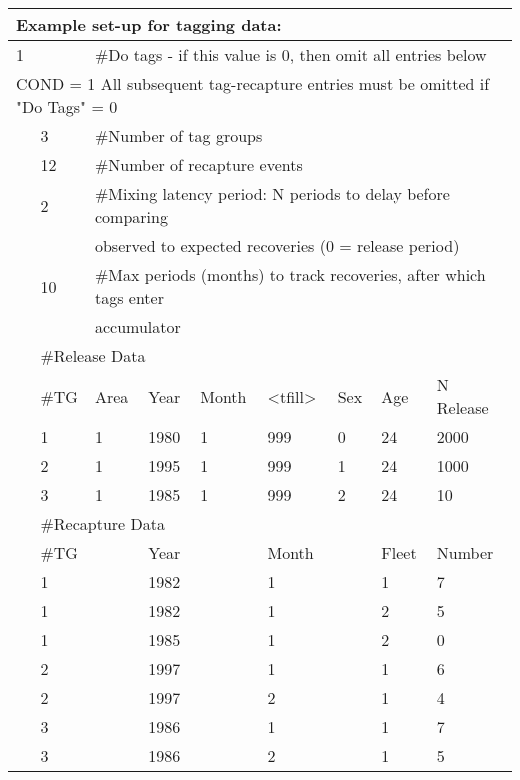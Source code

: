 \begin{center}
	\begin{tabular}{p{1.1cm} p{1.1cm} p{1.1cm} p{1.1cm} p{1.1cm} p{1.1cm} p{1.1cm} p{1.1cm} p{3cm}}
		\multicolumn{9}{l}{Example set-up for tagging data:}\\
		\hline
		1 & & \multicolumn{7}{l}{\#Do tags - if this value is 0, then omit all entries below}\\
		\hline
		\multicolumn{9}{l}{COND = 1 All subsequent tag-recapture entries must be omitted if "Do Tags" = 0}\\
		 & 3 & \multicolumn{7}{l}{\#Number of tag groups}\\
		 \hline
		 & 12 & \multicolumn{7}{l}{\#Number of recapture events}\\
		 \hline
		 & 2 & \multicolumn{7}{l}{\#Mixing latency period: N periods to delay before comparing }\\
		 &   &  \multicolumn{7}{l}{observed to expected recoveries (0 = release period)}\\
		 \hline
		 & 10 & \multicolumn{7}{l}{\#Max periods (months) to track recoveries, after which tags enter}\\
		 &    & \multicolumn{7}{l}{ accumulator}\\
		 \hline
		 & \multicolumn{8}{l}{\#Release Data} \\
		 & \#TG & Area & Year & Month & <tfill> & Sex & Age & N Release\\ 
		 \hline
		 & 1 & 1 & 1980 & 1 & 999 & 0 & 24 & 2000 \\
		 & 2 & 1 & 1995 & 1 & 999 & 1 & 24 & 1000 \\
		 & 3 & 1 & 1985 & 1 & 999 & 2 & 24 & 10 \\
		 \hline
		 & \multicolumn{8}{l}{\#Recapture Data}\\
		 & \#TG &  & Year&  & Month &  & Fleet  & Number\\ 
		 \hline
		 & 1 & & 1982 & & 1 & & 1 & 7 \\
		 & 1 & & 1982 & & 1 & & 2 & 5 \\
		 & 1 & & 1985 & & 1 & & 2 & 0 \\
		 & 2 & & 1997 & & 1 & & 1 & 6 \\
		 & 2 & & 1997 & & 2 & & 1 & 4 \\
		 & 3 & & 1986 & & 1 & & 1 & 7 \\
		 & 3 & & 1986 & & 2 & & 1 & 5 \\
		 \hline
	\end{tabular}
\end{center}

